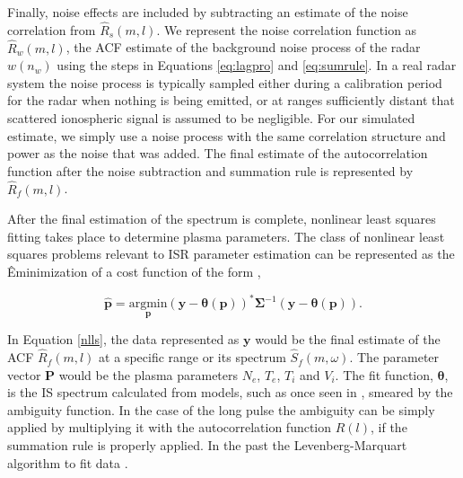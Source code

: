\documentclass[draft,ras]{agutex}
\newcommand{\pcom}[2]{\marginpar{{\footnotesize \bf #1}}{\it {#2}}}
\begin{document}
\begin{article}




Finally, noise effects are included by subtracting an estimate of the noise correlation from $\widehat{R}_s(m,l)$.  We represent the noise correlation function as $\widehat{R}_w(m,l)$, the ACF estimate of the background noise process of the radar $w(n_w)$ using the steps in Equations \ref{eq:lagpro} and \ref{eq:sumrule}. In a real radar system the noise process is typically sampled either during a calibration period for the radar when nothing is being emitted, or at ranges sufficiently distant that scattered ionospheric signal is assumed to be negligible. For our simulated estimate, we simply use a noise process with the same correlation structure and power as the noise that was added. The final estimate of the autocorrelation function after the noise subtraction and summation rule is represented by $\widehat{R}_f(m,l)$.


After the final estimation of the spectrum is complete, nonlinear least squares fitting takes place to determine plasma parameters.  
The class of nonlinear least squares problems relevant to ISR parameter estimation can be represented as the Êminimization of a cost function of the form \citep{kayvol1},

\begin{equation}
	\mathbf{\hat{p}}= \underset{\mathbf{p}}{\text{argmin}} (\mathbf{y}-\bm{\theta}(\mathbf{p}))^*\bm{\Sigma}^{-1}(\mathbf{y}-\bm{\theta}(\mathbf{p})).
\label{nlls}
\end{equation}

In Equation \ref{nlls}, the data represented as $\mathbf{y}$ would be the final estimate of the ACF $\widehat{R}_f(m,l)$ at a specific range or its spectrum $\widehat{S}_f(m,\omega)$. The parameter vector $\mathbf{P}$ would be the plasma parameters $N_e$, $T_e$, $T_i$ and $V_i$. The fit function, $\bm{\theta}$, is the IS spectrum calculated from models, such as once seen in \citep{kudeki:milla:1}, smeared by the ambiguity function. In the case of the long pulse the ambiguity can be simply applied by multiplying it with the autocorrelation function $R(l)$, if the summation rule is properly applied. In the past the Levenberg-Marquart algorithm to fit data \citep{nikoukar2008}.


\end{article}
\end{document}
